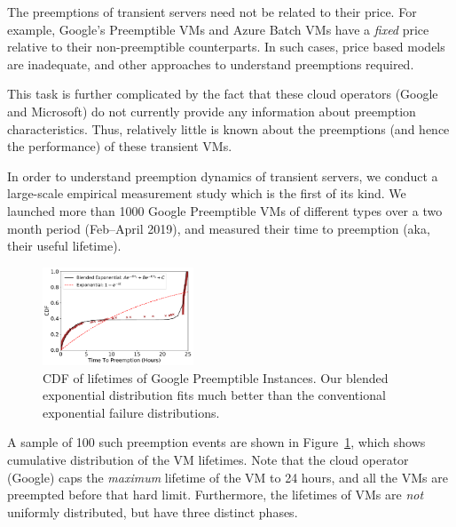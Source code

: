 The preemptions of transient servers need not be related to their price.
For example, Google's Preemptible VMs and Azure Batch VMs have a \emph{fixed} price relative to their non-preemptible counterparts. 
In such cases, price based models are inadequate, and other approaches to understand preemptions  required.

This task is further complicated by the fact that these cloud operators (Google and Microsoft) do not currently provide any information about preemption characteristics. 
Thus, relatively little is known about the preemptions (and hence the performance) of these transient VMs. %

In order to understand preemption dynamics of transient servers, we conduct a large-scale empirical measurement study which is the first of its kind. 
We launched more than 1000 Google Preemptible VMs of different types over a two month period (Feb--April 2019), and measured their time to preemption (aka, their useful lifetime).\footnotemark



\begin{figure}
  \centering
  \includegraphics[width=0.4\textwidth]{../data/cdf_all.pdf}
  \caption{CDF of lifetimes of Google Preemptible Instances. Our blended exponential distribution fits much better than the conventional exponential failure distributions. }
  \label{fig:gcp1}
\end{figure}

A sample of 100 such preemption events are shown in Figure~\ref{fig:gcp1}, which shows cumulative distribution of the VM lifetimes. 
Note that the cloud operator (Google) caps the \emph{maximum} lifetime of the VM to 24 hours, and all the VMs are preempted before that hard limit.
Furthermore, the lifetimes of VMs are \emph{not} uniformly distributed, but have three distinct phases. 


